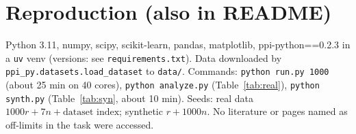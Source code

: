 \documentclass{article}
\begin{document}
\section{Reproduction (also in README)}
Python 3.11, numpy, scipy, scikit-learn, pandas, matplotlib, ppi-python==0.2.3 in a \texttt{uv} venv (versions: see \texttt{requirements.txt}). Data downloaded by \texttt{ppi\_py.datasets.load\_dataset} to \texttt{data/}. Commands: \texttt{python run.py 1000} (about 25 min on 40 cores), \texttt{python analyze.py} (Table~\ref{tab:real}), \texttt{python synth.py} (Table~\ref{tab:syn}, about 10 min). Seeds: real data $1000r+7n+\text{dataset index}$; synthetic $r+1000n$. No literature or pages named as off-limits in the task were accessed.

\newpage

\end{document}
